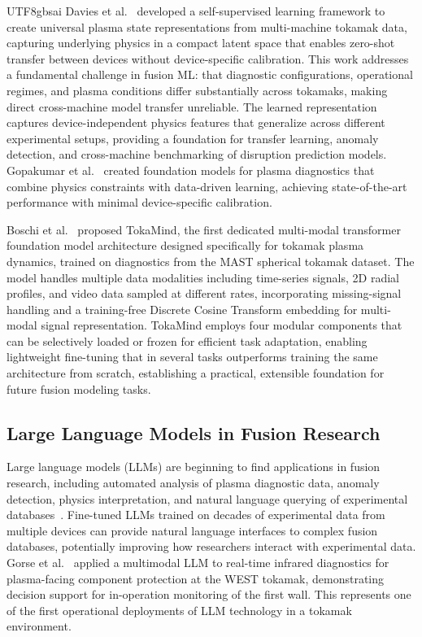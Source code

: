 \documentclass[12pt,a4paper]{article}
\begin{document}
\begin{CJK}{UTF8}{gbsai}
Davies et al.~\citep{Davies2025} developed a self-supervised learning framework to create universal plasma state representations from multi-machine tokamak data, capturing underlying physics in a compact latent space that enables zero-shot transfer between devices without device-specific calibration. This work addresses a fundamental challenge in fusion ML: that diagnostic configurations, operational regimes, and plasma conditions differ substantially across tokamaks, making direct cross-machine model transfer unreliable. The learned representation captures device-independent physics features that generalize across different experimental setups, providing a foundation for transfer learning, anomaly detection, and cross-machine benchmarking of disruption prediction models. Gopakumar et al.~\citep{Gopakumar2025} created foundation models for plasma diagnostics that combine physics constraints with data-driven learning, achieving state-of-the-art performance with minimal device-specific calibration.

Boschi et al.~\citep{Boschi2026} proposed TokaMind, the first dedicated multi-modal transformer foundation model architecture designed specifically for tokamak plasma dynamics, trained on diagnostics from the MAST spherical tokamak dataset. The model handles multiple data modalities including time-series signals, 2D radial profiles, and video data sampled at different rates, incorporating missing-signal handling and a training-free Discrete Cosine Transform embedding for multi-modal signal representation. TokaMind employs four modular components that can be selectively loaded or frozen for efficient task adaptation, enabling lightweight fine-tuning that in several tasks outperforms training the same architecture from scratch, establishing a practical, extensible foundation for future fusion modeling tasks.

\subsection{Large Language Models in Fusion Research}

Large language models (LLMs) are beginning to find applications in fusion research, including automated analysis of plasma diagnostic data, anomaly detection, physics interpretation, and natural language querying of experimental databases~\citep{Mathews2025LLM}. Fine-tuned LLMs trained on decades of experimental data from multiple devices can provide natural language interfaces to complex fusion databases, potentially improving how researchers interact with experimental data. Gorse et al.~\citep{Gorse2025} applied a multimodal LLM to real-time infrared diagnostics for plasma-facing component protection at the WEST tokamak, demonstrating decision support for in-operation monitoring of the first wall. This represents one of the first operational deployments of LLM technology in a tokamak environment.


\end{CJK}
\end{document}
